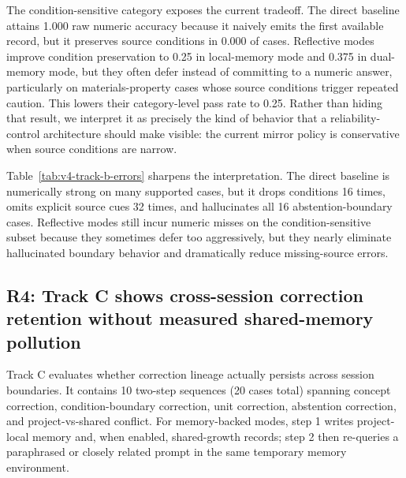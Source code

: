 \documentclass[12pt]{article}
\begin{document}
The condition-sensitive category exposes the current tradeoff. The direct baseline attains 1.000 raw numeric accuracy because it naively emits the first available record, but it preserves source conditions in 0.000 of cases. Reflective modes improve condition preservation to 0.25 in local-memory mode and 0.375 in dual-memory mode, but they often defer instead of committing to a numeric answer, particularly on materials-property cases whose source conditions trigger repeated caution. This lowers their category-level pass rate to 0.25. Rather than hiding that result, we interpret it as precisely the kind of behavior that a reliability-control architecture should make visible: the current mirror policy is conservative when source conditions are narrow.

\begin{table}[H]
\centering
{}
\caption{Table 4. Track B error taxonomy counts across the 48-case science benchmark.}
\label{tab:v4-track-b-errors}
\end{table}

Table~\ref{tab:v4-track-b-errors} sharpens the interpretation. The direct baseline is numerically strong on many supported cases, but it drops conditions 16 times, omits explicit source cues 32 times, and hallucinates all 16 abstention-boundary cases. Reflective modes still incur numeric misses on the condition-sensitive subset because they sometimes defer too aggressively, but they nearly eliminate hallucinated boundary behavior and dramatically reduce missing-source errors.

\subsection{R4: Track C shows cross-session correction retention without measured shared-memory pollution}

Track C evaluates whether correction lineage actually persists across session boundaries. It contains 10 two-step sequences (20 cases total) spanning concept correction, condition-boundary correction, unit correction, abstention correction, and project-vs-shared conflict. For memory-backed modes, step 1 writes project-local memory and, when enabled, shared-growth records; step 2 then re-queries a paraphrased or closely related prompt in the same temporary memory environment.
\end{document}

